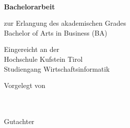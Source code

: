 \begin{titlepage}
\begin{center}
\vfill

\begin{minipage}{0.99\textwidth}
\begin{center}
\onehalfspacing
\Huge \textsf{\textbf{\mytitle}}
\end{center}
\end{minipage}

\vfill

{\LARGE \textsf{\textbf{\\ Bachelorarbeit}}}

\large
zur Erlangung des akademischen Grades \\
Bachelor of Arts in Business (BA)

\vspace{1em}

Eingereicht an der \\
Hochschule Kufstein Tirol\\
Studiengang Wirtschaftsinformatik 

\vspace{1em}

Vorgelegt von\\
\autor \\
\personalnummer \\

\vspace{1em}

Gutachter \\
\betreuer 

\vspace{1.5em}

\abgabedat


\end{center}
\end{titlepage}

